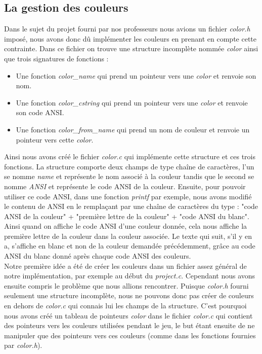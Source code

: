 \documentclass[11pt]{article}
\begin{document}
\subsection{La gestion des couleurs} \label{subsec: color}
Dans le sujet du projet fourni par nos professeurs nous avions un fichier \emph{color.h} imposé, nous avons donc dû implémenter les couleurs en prenant en compte cette contrainte. Dans ce fichier on trouve une structure incomplète nommée \emph{color} ainsi que trois signatures de fonctions : 
\\

\begin{itemize}
\item Une fonction \emph{color\_name} qui prend un pointeur vers une \emph{color} et renvoie son nom.
\item Une fonction \emph{color\_cstring} qui prend un pointeur vers une \emph{color} et renvoie son code ANSI.
\item Une fonction \emph{color\_from\_name} qui prend un nom de couleur et renvoie un pointeur vers cette \emph{color}.
\\

\end{itemize}


Ainsi nous avons créé le fichier \emph{color.c} qui implémente cette structure et ces trois fonctions. La structure comporte deux champs de type chaîne de caractères, l'un se nomme \emph{name} et représente le nom associé à la couleur tandis que le second se nomme \emph{ANSI} et représente le code ANSI de la couleur. Ensuite, pour pouvoir utiliser ce code ANSI, dans une fonction \emph{printf} par exemple, nous avons modifié le contenu de ANSI en le remplaçant par une chaîne de caractères du type : "code ANSI de la couleur" + "première lettre de la couleur" + "code ANSI du blanc". Ainsi quand on affiche le code ANSI d'une couleur donnée, cela nous affiche la première lettre de la couleur dans la couleur associée. Le texte qui suit, s'il y en a, s'affiche en blanc et non de la couleur demandée précédemment, grâce au code ANSI du blanc donné après chaque code ANSI des couleurs.
\\

Notre première idée a été de créer les couleurs dans un fichier assez général de notre implémentation, par exemple au début du \emph{project.c}. Cependant nous avons ensuite compris le problème que nous allions rencontrer. Puisque \emph{color.h} fourni seulement une structure incomplète, nous ne pouvons donc pas créer de couleurs en dehors de \emph{color.c} qui connais lui les champs de la structure. C'est pourquoi nous avons créé un tableau de pointeurs \emph{color} dans le fichier \emph{color.c} qui contient des pointeurs vers les couleurs utilisées pendant le jeu, le but étant ensuite de ne manipuler que des pointeurs vers ces couleurs (comme dans les fonctions fournies par \emph{color.h}).
\end{document}
